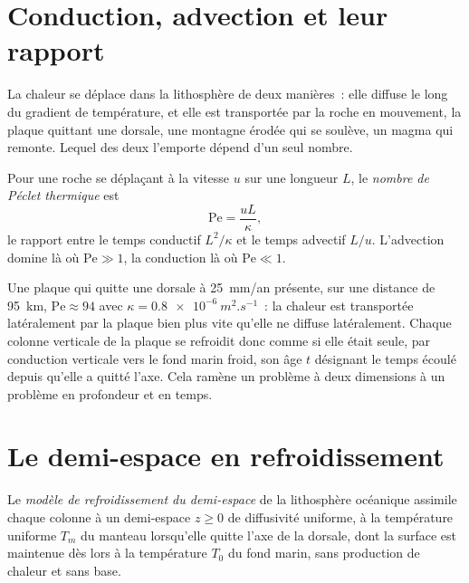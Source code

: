 \section{Conduction, advection et leur rapport}

La chaleur se déplace dans la lithosphère de deux manières~: elle diffuse le long du gradient
de température, et elle est transportée par la roche en mouvement, la plaque quittant une dorsale, une
montagne érodée qui se soulève, un magma qui remonte. Lequel des deux l'emporte dépend d'un seul
nombre.

\begin{definition}\label{def:b3:lithosphere-thermal-models:peclet}
Pour une roche se déplaçant à la vitesse $u$ sur une longueur $L$, le \emph{nombre de Péclet
thermique} est
\[
  \mathrm{Pe} = \frac{uL}{\kappa},
\]
le rapport entre le temps conductif $L^2/\kappa$ et le temps advectif $L/u$.
L'advection domine là où $\mathrm{Pe} \gg 1$, la conduction là où
$\mathrm{Pe} \ll 1$.
\end{definition}

Une plaque qui quitte une dorsale à \qty{25}{mm/an} présente, sur une distance de
\qty{95}{km}, $\mathrm{Pe} \approx 94$ avec $\kappa = \qty{0.8e-6}{m^2.s^{-1}}$~:
la chaleur est transportée latéralement par la plaque bien plus vite qu'elle ne diffuse latéralement.
Chaque colonne verticale de la plaque se refroidit donc comme si elle était seule, par
conduction verticale vers le fond marin froid, son âge $t$ désignant le temps écoulé depuis
qu'elle a quitté l'axe. Cela ramène un problème à deux dimensions à un problème en
profondeur et en temps.

\section{Le demi-espace en refroidissement}

\begin{definition}\label{def:b3:lithosphere-thermal-models:half-space}
Le \emph{modèle de refroidissement du demi-espace} de la
lithosphère océanique assimile chaque colonne à un demi-espace $z \ge 0$ de diffusivité
uniforme, à la température uniforme $T_m$ du manteau lorsqu'elle quitte l'axe de la
dorsale, dont la surface est maintenue dès lors à la température $T_0$ du fond marin,
sans production de chaleur et sans base.
\end{definition}

